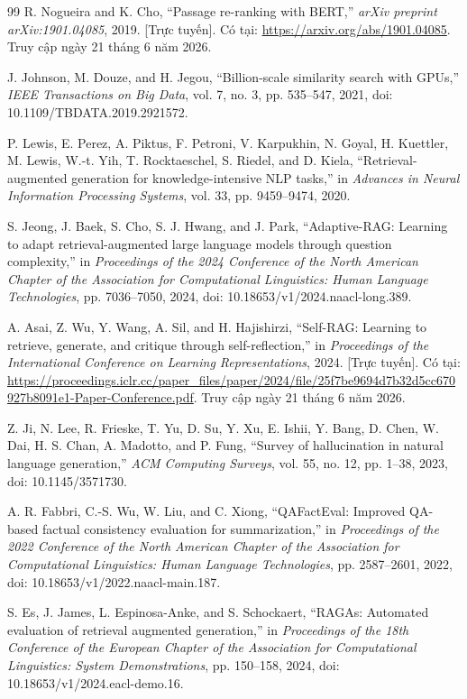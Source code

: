\documentclass[../DoAn.tex]{subfiles}
\begin{document}
\begin{thebibliography}{99}
R. Nogueira and K. Cho,
``Passage re-ranking with BERT,''
\emph{arXiv preprint arXiv:1901.04085}, 2019. [Trực tuyến]. Có tại:
\url{https://arxiv.org/abs/1901.04085}.
Truy cập ngày 21 tháng 6 năm 2026.

J. Johnson, M. Douze, and H. Jegou,
``Billion-scale similarity search with GPUs,''
\emph{IEEE Transactions on Big Data},
vol. 7, no. 3, pp. 535--547, 2021,
doi: 10.1109/TBDATA.2019.2921572.

P. Lewis, E. Perez, A. Piktus, F. Petroni, V. Karpukhin, N. Goyal,
H. Kuettler, M. Lewis, W.-t. Yih, T. Rocktaeschel, S. Riedel, and D. Kiela,
``Retrieval-augmented generation for knowledge-intensive NLP tasks,''
in \emph{Advances in Neural Information Processing Systems},
vol. 33, pp. 9459--9474, 2020.

S. Jeong, J. Baek, S. Cho, S. J. Hwang, and J. Park,
``Adaptive-RAG: Learning to adapt retrieval-augmented large language models
through question complexity,''
in \emph{Proceedings of the 2024 Conference of the North American Chapter of
the Association for Computational Linguistics: Human Language Technologies},
pp. 7036--7050, 2024,
doi: 10.18653/v1/2024.naacl-long.389.

A. Asai, Z. Wu, Y. Wang, A. Sil, and H. Hajishirzi,
``Self-RAG: Learning to retrieve, generate, and critique through
self-reflection,''
in \emph{Proceedings of the International Conference on Learning
Representations}, 2024. [Trực tuyến]. Có tại:
\url{https://proceedings.iclr.cc/paper_files/paper/2024/file/25f7be9694d7b32d5cc670927b8091e1-Paper-Conference.pdf}.
Truy cập ngày 21 tháng 6 năm 2026.

Z. Ji, N. Lee, R. Frieske, T. Yu, D. Su, Y. Xu, E. Ishii, Y. Bang,
D. Chen, W. Dai, H. S. Chan, A. Madotto, and P. Fung,
``Survey of hallucination in natural language generation,''
\emph{ACM Computing Surveys}, vol. 55, no. 12, pp. 1--38, 2023,
doi: 10.1145/3571730.

A. R. Fabbri, C.-S. Wu, W. Liu, and C. Xiong,
``QAFactEval: Improved QA-based factual consistency evaluation for
summarization,''
in \emph{Proceedings of the 2022 Conference of the North American Chapter of
the Association for Computational Linguistics: Human Language Technologies},
pp. 2587--2601, 2022,
doi: 10.18653/v1/2022.naacl-main.187.

S. Es, J. James, L. Espinosa-Anke, and S. Schockaert,
``RAGAs: Automated evaluation of retrieval augmented generation,''
in \emph{Proceedings of the 18th Conference of the European Chapter of the
Association for Computational Linguistics: System Demonstrations},
pp. 150--158, 2024,
doi: 10.18653/v1/2024.eacl-demo.16.


\end{thebibliography}
\end{document}
